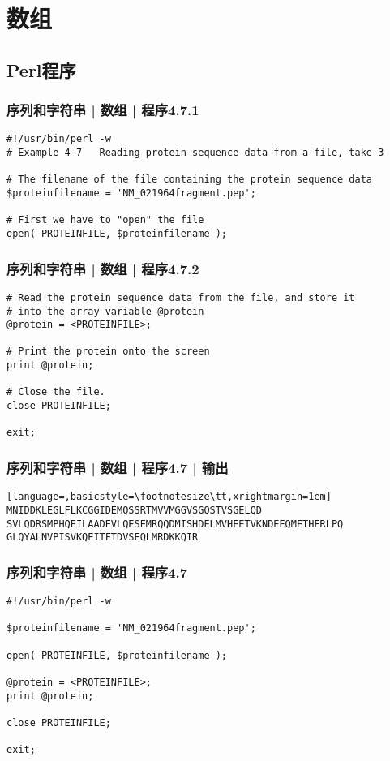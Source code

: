 \section{数组}
\subsection{Perl程序}
\begin{frame}[fragile]
  \frametitle{序列和字符串 | 数组 | 程序4.7.1}
  \vspace{-1.5em}
\begin{lstlisting}
#!/usr/bin/perl -w
# Example 4-7   Reading protein sequence data from a file, take 3

# The filename of the file containing the protein sequence data
$proteinfilename = 'NM_021964fragment.pep';

# First we have to "open" the file
open( PROTEINFILE, $proteinfilename );
\end{lstlisting}
\end{frame}

\begin{frame}[fragile]
  \frametitle{序列和字符串 | 数组 | 程序4.7.2}
  \vspace{-1.5em}
\begin{lstlisting}[firstnumber=10]
# Read the protein sequence data from the file, and store it
# into the array variable @protein
@protein = <PROTEINFILE>;

# Print the protein onto the screen
print @protein;

# Close the file.
close PROTEINFILE;

exit;
\end{lstlisting}
\end{frame}

\begin{frame}[fragile]
  \frametitle{序列和字符串 | 数组 | 程序4.7 | 输出}
  \vspace{-1.5em}
\begin{lstlisting}[language=,basicstyle=\footnotesize\tt,xrightmargin=1em]
MNIDDKLEGLFLKCGGIDEMQSSRTMVVMGGVSGQSTVSGELQD
SVLQDRSMPHQEILAADEVLQESEMRQQDMISHDELMVHEETVKNDEEQMETHERLPQ
GLQYALNVPISVKQEITFTDVSEQLMRDKKQIR
\end{lstlisting}
\end{frame}

\begin{frame}[fragile]
  \frametitle{序列和字符串 | 数组 | \alert{程序4.7}}
  \vspace{-1.5em}
\begin{lstlisting}
#!/usr/bin/perl -w

$proteinfilename = 'NM_021964fragment.pep';

open( PROTEINFILE, $proteinfilename );

@protein = <PROTEINFILE>;
print @protein;

close PROTEINFILE;

exit;
\end{lstlisting}
\end{frame}

